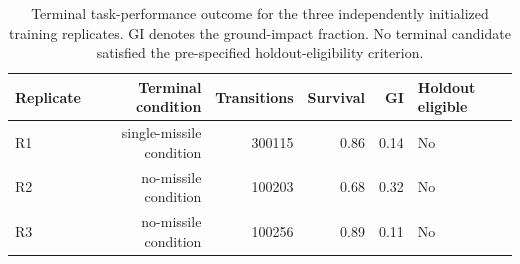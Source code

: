 \begin{table}[t]
\centering
\caption{Terminal task-performance outcome for the three independently initialized training replicates. GI denotes the ground-impact fraction. No terminal candidate satisfied the pre-specified holdout-eligibility criterion.}
\label{tab:terminal-performance}
\begin{tabular}{@{}lrrrrl@{}}
\toprule
Replicate & Terminal condition & Transitions & Survival & GI & Holdout eligible \\
\midrule
R1 & single-missile condition & 300115 & 0.86 & 0.14 & No \\
R2 & no-missile condition & 100203 & 0.68 & 0.32 & No \\
R3 & no-missile condition & 100256 & 0.89 & 0.11 & No \\
\bottomrule
\end{tabular}
\end{table}
